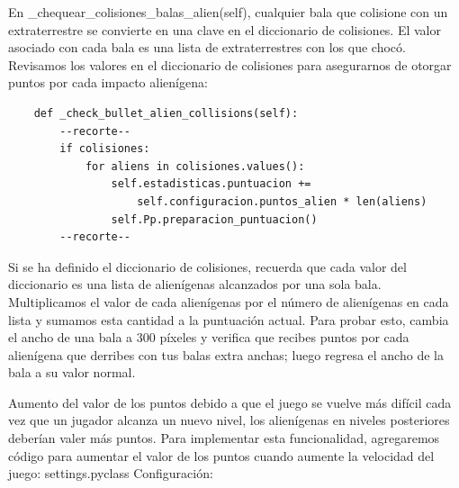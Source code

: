 En  {\ttfamily \_chequear\_colisiones\_balas\_alien(self)}, cualquier bala que colisione con un extraterrestre se convierte en una clave en el diccionario de colisiones. El valor asociado con cada bala es una lista de extraterrestres con los que chocó. Revisamos los valores en el diccionario de colisiones para asegurarnos de otorgar puntos por cada impacto alienígena:


\hspace{-2.4cm}{\ttfamily \scriptsize invasión}

\vspace{-0.2cm}
\hspace{-2.1cm}{\ttfamily \scriptsize \_alien.py}\vspace{-0.84cm} 
\begin{lstlisting}		
    def _check_bullet_alien_collisions(self):
        --recorte--
        if colisiones: 
            for aliens in colisiones.values(): 
                self.estadisticas.puntuacion += 
                    self.configuracion.puntos_alien * len(aliens)
                self.Pp.preparacion_puntuacion()     
        --recorte--
\end{lstlisting}

Si se ha definido el diccionario de colisiones, recuerda que cada valor del diccionario es una lista de alienígenas alcanzados 
por una sola bala. Multiplicamos el valor de cada alienígenas por el número de  alienígenas en cada lista y sumamos esta cantidad a la puntuación actual. Para probar esto, cambia el ancho de una bala a 300 píxeles y verifica que recibes puntos por cada alienígena que 
derribes con tus balas extra anchas; luego regresa el ancho de la bala a su valor normal. 

Aumento del valor de los puntos debido a que el juego se vuelve más difícil cada vez que un jugador alcanza un nuevo nivel,
los alienígenas en niveles posteriores deberían valer más puntos. Para implementar esta funcionalidad, agregaremos código para aumentar el valor de los puntos cuando aumente la velocidad del juego: settings.pyclass Configuración:


